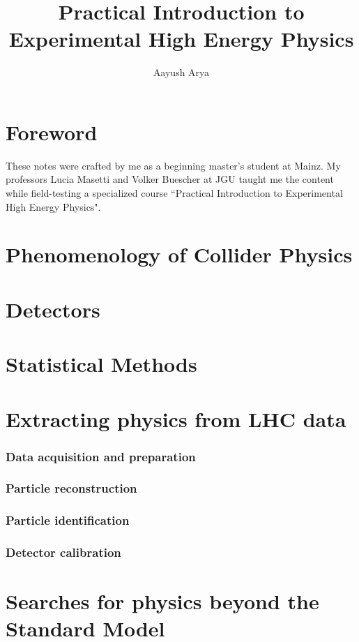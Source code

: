 \documentclass[11pt]{article}
\author{Aayush Arya}
\title{Practical Introduction to Experimental High Energy Physics}
\affiliation{Johannes Gutenberg-Universitat Mainz}
\begin{document}
	
	\maketitle
	
	\pagestyle{fancynotes}
	
	\part*{Foreword}
	These notes were crafted by me as a beginning master's student at Mainz. My professors Lucia Masetti and Volker Buescher at JGU taught me the content while field-testing a specialized course ``Practical Introduction to Experimental High Energy Physics".
	
	\newpage
	
	\part{Phenomenology of Collider Physics}
	
	\newpage
	\part{Detectors}
	
	\newpage
	\part{Statistical Methods}
	
	\newpage
	\part{Extracting physics from LHC data}
	\newpage
	\section{Data acquisition and preparation}
	
	\newpage
	\section{Particle reconstruction}
	
	\newpage
	\section{Particle identification}
	
	\newpage
	\section{Detector calibration}
	
	\newpage
	
	
	\newpage
	\part{Searches for physics beyond the Standard Model}
	
\end{document}
